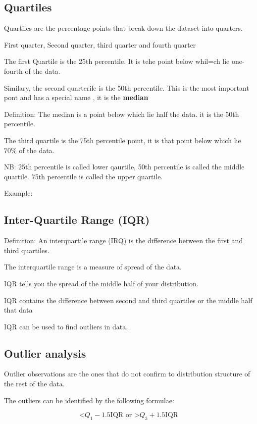 \documentclass[12pt,a4paper]{article}
\begin{document}
\subsection{Quartiles}
Quartiles are the percentage points that break down the dataset into quarters.

First quarter, Second quarter, third quarter and fourth quarter

The first Quartile is the 25th percentile. It is tehe point below whil=ch lie one-fourth of the data.

Similary, the second quarterile is the 50th percentile. This is the most important pont and has a special name , it is the \textbf{median}

Definition: The median is a point below which lie half the data. it is the 50th percentile.

The third quartile is the 75th percentile point, it is that point below which lie $70\%$ of the data.

NB: 25th percentile is called lower qaurtile, 50th percentile is called the middle quartile. 75th percentile is called the upper quartile.

Example:

\subsection{Inter-Quartile Range (IQR)}
Definition: An interquartile range (IRQ) is the difference between the first and third quartiles.

The interquartile range is a measure of spread of the data.

IQR tells you the spread of the middle half of your distribution.

IQR contains the {difference between} second and third quartiles  or the middle half that data

IQR can be used to find outliers in data.

\subsection{Outlier analysis}
Outlier observations are the ones that do not confirm to distribution structure of the rest of the data.

The outliers can be identified by the following formulae:

\begin{equation}
    \text{<}Q_1 - 1.5\text{IQR or >} Q_3 + 1.5\text{IQR}
\end{equation}
\end{document}
